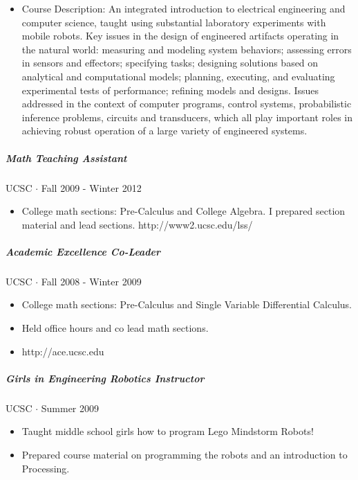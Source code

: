 \documentclass[10pt,letterpaper]{article}
\begin{document}
\begin{itemize}
\item Course Description: An integrated introduction to electrical engineering and computer science, taught using substantial laboratory experiments with mobile robots. Key issues in the design of engineered artifacts operating in the natural world: measuring and modeling system behaviors; assessing errors in sensors and effectors; specifying tasks; designing solutions based on analytical and computational models; planning, executing, and evaluating experimental tests of performance; refining models and designs. Issues addressed in the context of computer programs, control systems, probabilistic inference problems, circuits and transducers, which all play important roles in achieving robust operation of a large variety of engineered systems.
\end{itemize}

\subparagraph{Math Teaching Assistant}
UCSC $\cdot$ Fall 2009 - Winter 2012
\begin{itemize}
\item College math sections: Pre-Calculus and College Algebra. I prepared section material and lead sections. http://www2.ucsc.edu/lss/
\end{itemize}

\subparagraph{Academic Excellence Co-Leader}
UCSC $\cdot$ Fall 2008 - Winter 2009
\begin{itemize}
\item College math sections: Pre-Calculus and Single Variable Differential Calculus.
\item Held office hours and co lead math sections.
\item http://ace.ucsc.edu
\end{itemize}

\subparagraph{Girls in Engineering Robotics Instructor}
UCSC $\cdot$ Summer 2009
\begin{itemize}
\item Taught middle school girls how to program Lego Mindstorm Robots!
\item Prepared course material on programming the robots and an introduction to Processing.
\end{itemize}




\end{document}
